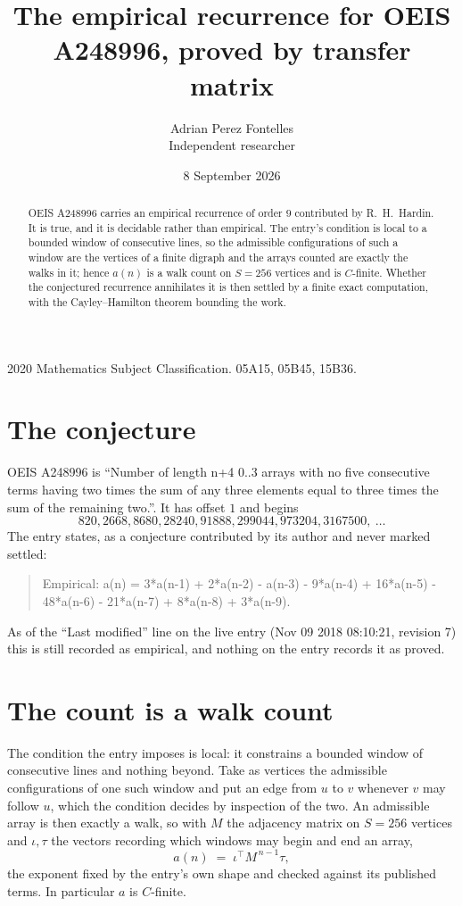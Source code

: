 \documentclass[11pt,a4paper]{article}
\title{The empirical recurrence for OEIS A248996, proved by transfer matrix}
\author{Adrian Perez Fontelles\\ \small Independent researcher}
\date{8 September 2026}
\theoremstyle{plain}
\theoremstyle{definition}
\begin{document}
\maketitle

\begin{abstract}
OEIS A248996 carries an empirical recurrence of order $9$ contributed by R.~H.~Hardin. It is
true, and it is decidable rather than empirical. The entry's condition is local to a bounded window of consecutive lines, so
the admissible configurations of such a window are the vertices of a finite digraph and the
arrays counted are exactly the walks in it; hence $a(n)$ is a walk count on $S=256$ vertices
and is $C$-finite. Whether the conjectured recurrence annihilates it is then settled by a
finite exact computation, with the Cayley--Hamilton theorem bounding the work.
\end{abstract}

\noindent\small 2020 Mathematics Subject Classification. 05A15, 05B45, 15B36.\normalsize

\section{The conjecture}

OEIS A248996 is ``Number of length n+4 0..3 arrays with no five consecutive terms having two times the sum of any three elements equal to three times the sum of the remaining two.''. It has offset $1$ and begins
\[
820, 2668, 8680, 28240, 91888, 299044, 973204, 3167500,\ \dots
\]
The entry states, as a conjecture contributed by its author and never marked settled:
\begin{quote}
Empirical: a(n) = 3*a(n-1) + 2*a(n-2) - a(n-3) - 9*a(n-4) + 16*a(n-5) - 48*a(n-6) - 21*a(n-7) + 8*a(n-8) + 3*a(n-9).
\end{quote}
As of the ``Last modified'' line on the live entry (Nov 09 2018 08:10:21, revision 7) this is still
recorded as empirical, and nothing on the entry records it as proved.

\section{The count is a walk count}

The condition the entry imposes is local: it constrains a bounded window of consecutive lines and nothing beyond. Take as
vertices the admissible configurations of one such window and put an edge from $u$ to $v$
whenever $v$ may follow $u$, which the condition decides by inspection of the two. An
admissible array is then exactly a walk, so with $M$ the adjacency matrix on $S=256$ vertices
and $\iota,\tau$ the vectors recording which windows may begin and end an array,
\[
a(n)\;=\;\iota^{\!\top}M^{\,n-1}\tau ,
\]
the exponent fixed by the entry's own shape and checked against its published terms. In
particular $a$ is $C$-finite.
\end{document}
